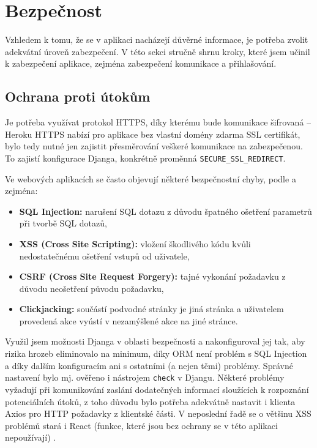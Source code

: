     \section{Bezpečnost}\label{sec:bezpecnost}
    Vzhledem k tomu, že se v aplikaci nacházejí důvěrné informace, je potřeba zvolit adekvátní úroveň zabezpečení. V této sekci stručně shrnu kroky, které jsem učinil k zabezpečení aplikace, zejména zabezpečení komunikace a přihlašování.
    
    \subsection{Ochrana proti útokům}\label{sec:bezpecnostOchrana}
    Je potřeba využívat protokol HTTPS, díky kterému bude komunikace šifrovaná -- Heroku HTTPS nabízí pro aplikace bez vlastní domény zdarma SSL certifikát, bylo tedy nutné jen zajistit přesměrování veškeré komunikace na zabezpečenou. To zajistí konfigurace Djanga, konkrétně proměnná \verb|SECURE_SSL_REDIRECT|.
    
    Ve webových aplikacích se často objevují některé bezpečnostní chyby, podle \cite{bezpecnost1} a \cite{bezpecnost2} zejména:
    \begin{itemize}
        \item \textbf{SQL Injection:} narušení SQL dotazu z důvodu špatného ošetření parametrů při tvorbě SQL dotazů,
        \item \textbf{XSS (Cross Site Scripting):} vložení škodlivého kódu kvůli nedostatečnému ošetření vstupů od uživatele,
        \item \textbf{CSRF (Cross Site Request Forgery):} tajné vykonání požadavku z důvodu neošetření původu požadavku,
        \item \textbf{Clickjacking:} součástí podvodné stránky je jiná stránka a uživatelem provedená akce vyústí v nezamýšlené akce na jiné stránce.
    \end{itemize}
    
    Využil jsem možnosti Djanga v oblasti bezpečnosti \cite{bezpecnost1} a nakonfiguroval jej tak, aby rizika hrozeb eliminovalo na minimum, díky ORM není problém s SQL Injection a díky dalším konfiguracím ani s ostatními (a nejen těmi) problémy. Správné nastavení bylo mj. ověřeno i nástrojem \verb|check| v Djangu. Některé problémy vyžadují při komunikování zaslání dodatečných informací sloužících k rozpoznání potenciálních útoků, z toho důvodu bylo potřeba adekvátně nastavit i klienta Axios pro HTTP požadavky z klientské části. V neposlední řadě se o většinu XSS problémů stará i React (funkce, které jsou bez ochrany se v této aplikaci nepoužívají) \cite{bezpecnost3}.
    
